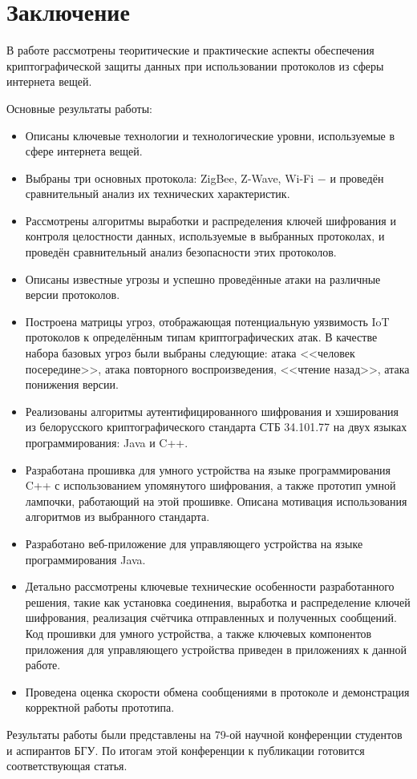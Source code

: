 \chapter*{Заключение}
	
	В работе рассмотрены теоритические и практические аспекты обеспечения криптографической защиты 
	данных при использовании протоколов из сферы интернета вещей.
	
	Основные результаты работы:
	
	\begin{itemize}
		\item Описаны ключевые технологии и технологические уровни, используемые в сфере интернета вещей.
		\item Выбраны три основных протокола: ZigBee, Z-Wave, Wi-Fi $-$ и проведён сравнительный анализ
		их технических характеристик.
		\item Рассмотрены алгоритмы выработки и распределения ключей шифрования и контроля целостности
		данных, используемые в выбранных протоколах, и проведён сравнительный анализ безопасности этих
		протоколов.
		\item Описаны известные угрозы и успешно проведённые атаки на различные версии протоколов.
		\item Построена матрицы угроз, отображающая потенциальную уязвимость IoT протоколов к 
		определённым типам криптографических атак. В качестве набора базовых угроз были выбраны 
		следующие: атака <<человек посередине>>, атака повторного воспроизведения, <<чтение назад>>, 
		атака понижения версии.
		\item Реализованы алгоритмы аутентифицированного шифрования и хэширования из белорусского 
		криптографического стандарта СТБ 34.101.77 на двух языках программирования: Java и C++.
		\item Разработана прошивка для умного устройства на языке программирования C++ с использованием 
		упомянутого шифрования, а также прототип умной лампочки, работающий на этой прошивке. Описана 
		мотивация использования алгоритмов из выбранного стандарта.
		\item Разработано веб-приложение для управляющего устройства на языке программирования Java.
		\item Детально рассмотрены ключевые технические особенности разработанного решения, такие как 
		установка соединения, выработка и распределение ключей шифрования, реализация счётчика отправленных 
		и полученных сообщений. Код прошивки для умного устройства, а также ключевых компонентов приложения
		для управляющего устройства приведен в приложениях к данной работе.
		\item Проведена оценка скорости обмена сообщениями в протоколе и демонстрация корректной работы 
		прототипа.
	\end{itemize}

	Результаты работы были представлены на 79-ой научной конференции студентов и аспирантов БГУ.
	По итогам этой конференции к публикации готовится соответствующая статья.
